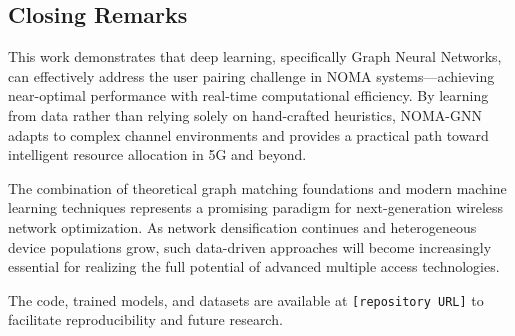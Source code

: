 \subsection{Closing Remarks}

This work demonstrates that deep learning, specifically Graph Neural Networks, can effectively address the user pairing challenge in NOMA systems—achieving near-optimal performance with real-time computational efficiency. By learning from data rather than relying solely on hand-crafted heuristics, NOMA-GNN adapts to complex channel environments and provides a practical path toward intelligent resource allocation in 5G and beyond.

The combination of theoretical graph matching foundations and modern machine learning techniques represents a promising paradigm for next-generation wireless network optimization. As network densification continues and heterogeneous device populations grow, such data-driven approaches will become increasingly essential for realizing the full potential of advanced multiple access technologies.

The code, trained models, and datasets are available at \texttt{[repository URL]} to facilitate reproducibility and future research.
